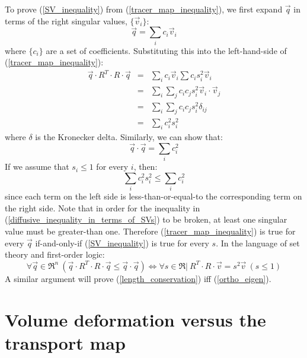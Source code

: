 \documentclass[11pt]{article}
\begin{document}
To prove (\ref{SV_inequality}) from (\ref{tracer_map_inequality}), we first
expand $\vec q$ in terms of the right singular values, 
$\lbrace \vec v_i \rbrace$:
\begin{equation}
	\vec q = \sum_i c_i \vec v_i
\end{equation}
where $\lbrace c_i \rbrace$ are a set of coefficients.
Substituting this into the left-hand-side of (\ref{tracer_map_inequality}):
\begin{eqnarray}
	\vec q \cdot R^T \cdot R \cdot \vec q & = & \sum_i c_i \vec v_i \sum c_i s_i^2 \vec v_i \\
   & = & \sum_i \sum_j c_i c_j s_i^2 \vec v_i \cdot \vec v_j \\
   & = & \sum_i \sum_j c_i c_j s_i^2 \delta_{ij} \\
	  & = & \sum_i c_i^2 s_i^2
\end{eqnarray}
where $\delta$ is the Kronecker delta.
Similarly, we can show that:
\begin{equation}
	\vec q \cdot \vec q = \sum_i c_i^2
\end{equation}
If we assume that $s_i \le 1$ for every $i$, then:
\begin{equation}
	\sum_i c_i^2 s_i^2 \le \sum_i c_i^2 
	\label{diffusive_inequality_in_terms_of_SVs}
\end{equation}
since each term on the left side is less-than-or-equal-to the
corresponding term on the right side. 
Note that in order for the inequality in 
(\ref{diffusive_inequality_in_terms_of_SVs}) to be broken, at least one
singular value must be greater-than one.
Therefore (\ref{tracer_map_inequality}) is true for every $\vec q$
if-and-only-if (\ref{SV_inequality}) is true for every $s$.
In the language of set theory and first-order logic:
\begin{equation}
	\forall \vec q \in \Re^n ~ (\vec q \cdot R^T \cdot R \cdot \vec q \le \vec q \cdot \vec q) \iff \forall s \in \Re | ~R^T \cdot R \cdot \vec v = s^2 \vec v ~ (s \le 1)
\end{equation}
A similar argument will prove (\ref{length_conservation})
iff (\ref{ortho_eigen}).

\section{Volume deformation versus the transport map}
\end{document}
